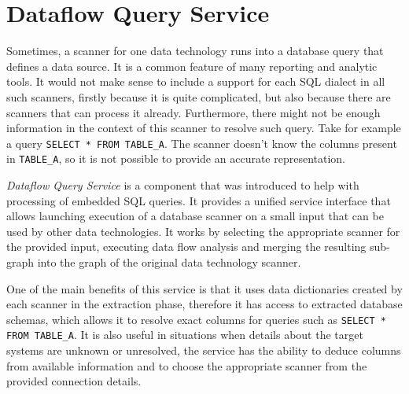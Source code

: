 \section{Dataflow Query Service}

Sometimes, a scanner for one data technology runs into a database query that defines a data source. It is a common feature of many reporting and analytic tools. It would not make sense to include a support for each SQL dialect in all such scanners, firstly because it is quite complicated, but also because there are scanners that can process it already. Furthermore, there might not be enough information in the context of this scanner to resolve such query. Take for example a query \texttt{SELECT * FROM TABLE\_A}. The scanner doesn't know the columns present in \texttt{TABLE\_A}, so it is not possible to provide an accurate representation. 
\par
\textit{Dataflow Query Service} is a component that was introduced to help with processing of embedded SQL queries. It provides a unified service interface that allows launching execution of a database scanner on a small input that can be used by other data technologies. It works by selecting the appropriate scanner for the provided input, executing data flow analysis and merging the resulting sub-graph into the graph of the original data technology scanner.
\par
One of the main benefits of this service is that it uses data dictionaries created by each scanner in the extraction phase, therefore it has access to extracted database schemas, which allows it to resolve exact columns for queries such as \texttt{SELECT * FROM TABLE\_A}. It is also useful in situations when details about the target systems are unknown or unresolved, the service has the ability to deduce columns from available information and to choose the appropriate scanner from the provided connection details.

